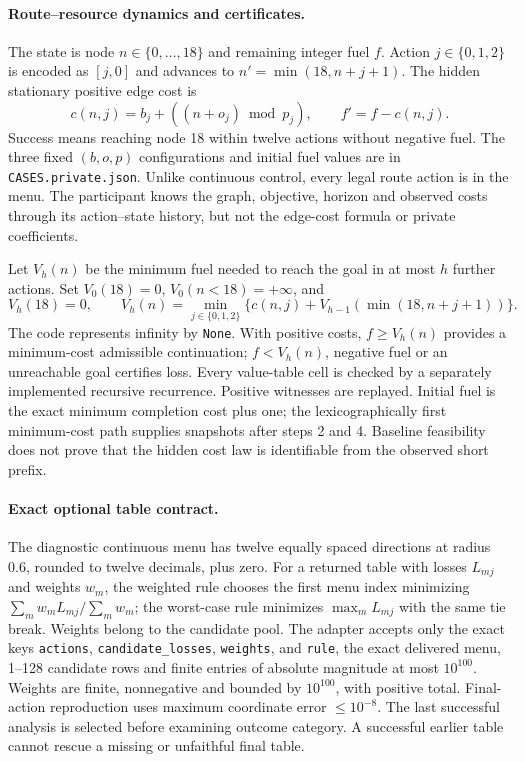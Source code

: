 \paragraph{Route--resource dynamics and certificates.}
The state is node $n\in\{0,\ldots,18\}$ and remaining integer fuel $f$.
Action $j\in\{0,1,2\}$ is encoded as $[j,0]$ and advances to
$n'=\min(18,n+j+1)$. The hidden stationary positive edge cost is
\begin{equation}
c(n,j)=b_j+((n+o_j)\bmod p_j),\qquad f'=f-c(n,j).
\end{equation}
Success means reaching node 18 within twelve actions without negative
fuel. The three fixed $(b,o,p)$ configurations and initial fuel values
are in \texttt{CASES.private.json}. Unlike continuous control, every
legal route action is in the menu. The participant knows the graph,
objective, horizon and observed costs through its action--state history,
but not the edge-cost formula or private coefficients.

Let $V_h(n)$ be the minimum fuel needed to reach the goal in at most
$h$ further actions. Set $V_0(18)=0$, $V_0(n<18)=+\infty$, and
\begin{equation}
V_h(18)=0,\qquad
V_h(n)=\min_{j\in\{0,1,2\}}
\{c(n,j)+V_{h-1}(\min(18,n+j+1))\}.
\end{equation}
The code represents infinity by \texttt{None}. With positive costs,
$f\geq V_h(n)$ provides a minimum-cost admissible continuation;
$f<V_h(n)$, negative fuel or an unreachable goal certifies loss.
Every value-table cell is checked by a separately implemented recursive
recurrence. Positive witnesses are replayed. Initial fuel is the exact
minimum completion cost plus one; the lexicographically first
minimum-cost path supplies snapshots after steps 2 and 4. Baseline
feasibility does not prove that the hidden cost law is identifiable from
the observed short prefix.

\paragraph{Exact optional table contract.}
The diagnostic continuous menu has twelve equally spaced directions at
radius $0.6$, rounded to twelve decimals, plus zero. For a returned
table with losses $L_{mj}$ and weights $w_m$, the weighted rule chooses
the first menu index minimizing $\sum_m w_mL_{mj}/\sum_mw_m$; the
worst-case rule minimizes $\max_m L_{mj}$ with the same tie break.
Weights belong to the candidate pool. The adapter accepts only the
exact keys \texttt{actions}, \texttt{candidate\_losses},
\texttt{weights}, and \texttt{rule}, the exact delivered menu, 1--128
candidate rows and finite entries of absolute magnitude at most
$10^{100}$. Weights are finite, nonnegative and bounded by $10^{100}$,
with positive total. Final-action reproduction uses maximum coordinate
error $\leq10^{-8}$. The last successful analysis is selected before
examining outcome category. A successful earlier table cannot rescue
a missing or unfaithful final table.

